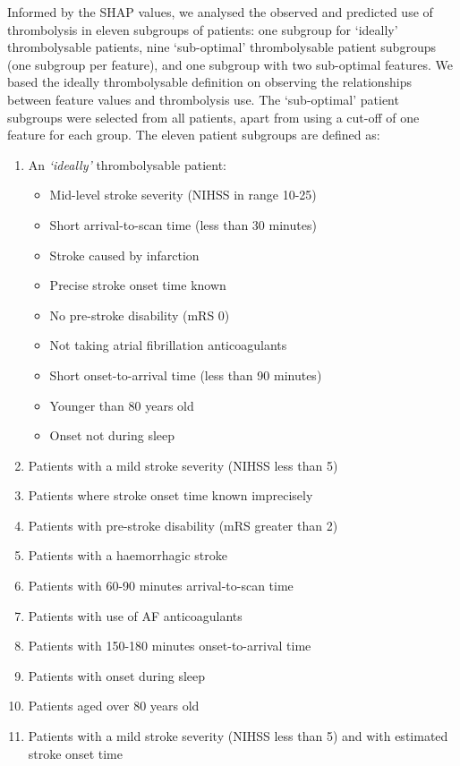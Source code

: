 Informed by the SHAP values, we analysed the observed and predicted use of thrombolysis in eleven subgroups of patients: one subgroup for `ideally' thrombolysable patients, nine `sub-optimal' thrombolysable patient subgroups (one subgroup per feature), and one subgroup with two sub-optimal features. We based the ideally thrombolysable definition on observing the relationships between feature values and thrombolysis use. The `sub-optimal' patient subgroups were selected from all patients, apart from using a cut-off of one feature for each group. The eleven patient subgroups are defined as:

\begin{enumerate}
  \item An \emph{`ideally'} thrombolysable patient:
  \begin{itemize}
    \setlength\itemsep{-2mm}
    \item Mid-level stroke severity (NIHSS in range 10-25)
    \item Short arrival-to-scan time (less than 30 minutes)
    \item Stroke caused by infarction
    \item Precise stroke onset time known
    \item No pre-stroke disability (mRS 0)
    \item Not taking atrial fibrillation anticoagulants
    \item Short onset-to-arrival time (less than 90 minutes)
    \item Younger than 80 years old
    \item Onset not during sleep
  \end{itemize}
  \item Patients with a mild stroke severity (NIHSS less than 5)
  \item Patients where stroke onset time known imprecisely
  \item Patients with pre-stroke disability (mRS greater than 2)
  \item Patients with a haemorrhagic stroke
  \item Patients with 60-90 minutes arrival-to-scan time
  \item Patients with use of AF anticoagulants
  \item Patients with 150-180 minutes onset-to-arrival time
  \item Patients with onset during sleep
  \item Patients aged over 80 years old
  \item Patients with a mild stroke severity (NIHSS less than 5) and with estimated stroke onset time
\end{enumerate}


